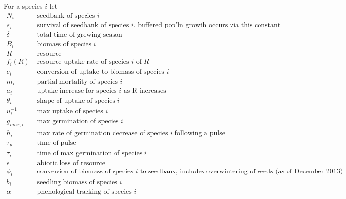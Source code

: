 \documentclass[11pt,a4paper,oneside]{article}
\begin{document}
\noindent For a species \(i\) let:
\begin{align*}
N_{i} & \text{   seedbank of species } i
\\
s_{i} & \text{   survival of seedbank of species } i \text{, buffered pop'ln
  growth occurs via this constant}
\\
\delta & \text{   total time of growing season}
\\
B_{i} &  \text{   biomass of species } i
\\
R &   \text{   resource}
\\
f_{i}(R) & \text{  resource uptake rate of species } i \text{ of } R
\\
c_{i} & \text{   conversion of uptake to biomass of species } i
\\
m_{i} & \text{   partial mortality of species } i
\\
a_{i} & \text{   uptake increase for species } i \text{ as R increases}
\\
\theta_{i} & \text{   shape of uptake of species } i
\\
u_{i}^{-1} & \text{   max uptake of species } i
\\
g_{max,i} & \text{   max germination of species } i
\\
h_{i} & \text{   max rate of germination decrease of species } i
\text{ following a pulse}
\\
\tau_{p} & \text{   time of pulse }
\\
\tau_{i} & \text{   time of max germination of species } i
\\
\epsilon & \text{   abiotic loss of resource}
\\
\phi_{i} & \text{   conversion of biomass of species } i \text{ to
  seedbank, includes overwintering of seeds (as of December 2013)}
\\
b_{i} & \text{   seedling biomass of species } i
\\
\alpha & \text{   phenological tracking of species  } i
\\
\end{align*}
\end{document}
